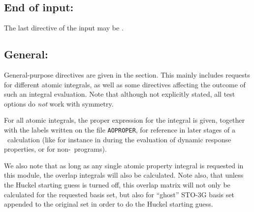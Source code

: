 \subsection{End of input: }

The last directive of the  input may be .

\subsection{General: }

General-purpose directives are given in the 
section. This mainly includes requests for different atomic integrals,
as well as some
directives affecting the outcome of such an integral evaluation. Note
that although not explicitly stated, all test options do {\em not}
work with symmetry.

For all atomic integrals, the proper expression for the integral is
given, together with the labels written on the file
\texttt{AOPROPER}, for
reference in later stages of a \siraba\ calculation (like for instance
in during the evaluation of dynamic response properties, or for
non-\siraba\ programs).

We also note that as long as any single atomic property
integral is
requested in this module, the overlap integrals will also be
calculated. Note also, that unless the Huckel starting guess is turned
off, this overlap matrix will not only be calculated for the requested
basis set, but also for ``ghost'' STO-3G basis set appended to the
original set in order to do the Huckel starting guess.


